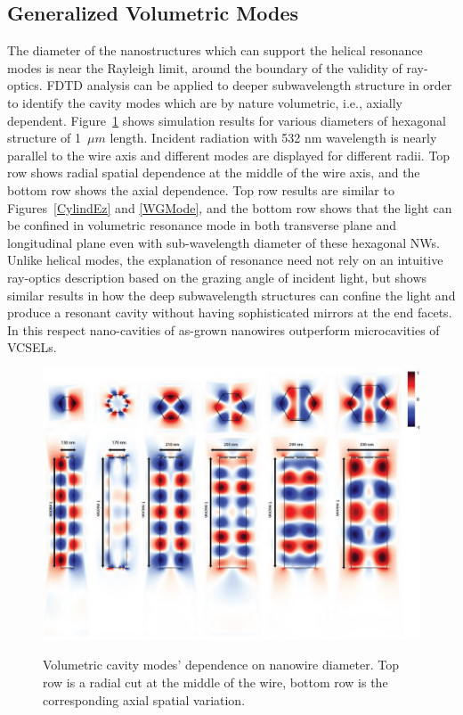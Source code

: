 \subsection{Generalized Volumetric Modes}

The diameter of the nanostructures which can support the helical resonance
modes is near the Rayleigh limit, around the boundary of the validity of
ray-optics. FDTD analysis can be applied to deeper subwavelength structure in
order to identify the cavity modes which are by nature volumetric, i.e.,
axially dependent. Figure~\ref{TMRadiusVarition} shows simulation results for
various diameters of hexagonal structure of 1~$\mu{m}$ length. Incident
radiation with 532 nm wavelength is nearly parallel to the wire axis and
different modes are displayed for different radii. Top row shows radial spatial
dependence at the middle of the wire axis, and the bottom row shows the axial
dependence. Top row results are similar to Figures~\ref{CylindEz} and
\ref{WGMode}, and the bottom row shows that the light can be confined in
volumetric resonance mode in both transverse plane and longitudinal plane even
with sub-wavelength diameter of these hexagonal NWs. Unlike helical modes, the
explanation of resonance need not rely on an intuitive ray-optics description
based on the grazing angle of incident light, but shows similar results in how
the deep subwavelength structures can confine the light and produce a resonant
cavity without having sophisticated mirrors at the end facets. In this respect
nano-cavities of as-grown nanowires outperform microcavities of VCSELs.

\begin{figure}
  \caption{Volumetric cavity modes' dependence on nanowire diameter. Top row is a radial cut at the middle of the wire, bottom row is the corresponding axial spatial variation.}
  \centering
  \includegraphics[width=\textwidth]{pictures/LM/TMRadiusVarition}
  \label{TMRadiusVarition}
\end{figure}

